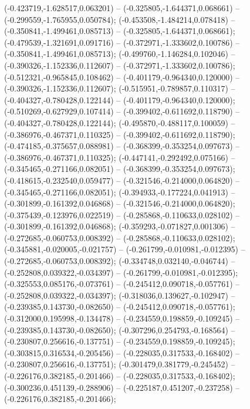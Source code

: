  (-0.423719,-1.628517,0.063201) -- (-0.325805,-1.644371,0.068661) -- (-0.299559,-1.765955,0.050784);
 (-0.453508,-1.484214,0.078418) -- (-0.350841,-1.499461,0.085713) -- (-0.325805,-1.644371,0.068661);
 (-0.479539,-1.321691,0.091716) -- (-0.372971,-1.333602,0.100786) -- (-0.350841,-1.499461,0.085713);
 (-0.499760,-1.146284,0.102046) -- (-0.390326,-1.152336,0.112607) -- (-0.372971,-1.333602,0.100786);
 (-0.512321,-0.965845,0.108462) -- (-0.401179,-0.964340,0.120000) -- (-0.390326,-1.152336,0.112607);
 (-0.515951,-0.789857,0.110317) -- (-0.404327,-0.780428,0.122144) -- (-0.401179,-0.964340,0.120000);
 (-0.510269,-0.627929,0.107414) -- (-0.399402,-0.611692,0.118790) -- (-0.404327,-0.780428,0.122144);
 (-0.495870,-0.488117,0.100059) -- (-0.386976,-0.467371,0.110325) -- (-0.399402,-0.611692,0.118790);
 (-0.474185,-0.375657,0.088981) -- (-0.368399,-0.353254,0.097673) -- (-0.386976,-0.467371,0.110325);
 (-0.447141,-0.292492,0.075166) -- (-0.345465,-0.271166,0.082051) -- (-0.368399,-0.353254,0.097673);
 (-0.418615,-0.232540,0.059477) -- (-0.321546,-0.214000,0.064820) -- (-0.345465,-0.271166,0.082051);
 (-0.394933,-0.177224,0.041913) -- (-0.301899,-0.161392,0.046868) -- (-0.321546,-0.214000,0.064820);
 (-0.375439,-0.123976,0.022519) -- (-0.285868,-0.110633,0.028102) -- (-0.301899,-0.161392,0.046868);
 (-0.359293,-0.071827,0.001306) -- (-0.272685,-0.060753,0.008392) -- (-0.285868,-0.110633,0.028102);
 (-0.345881,-0.020005,-0.021757) -- (-0.261799,-0.010981,-0.012395) -- (-0.272685,-0.060753,0.008392);
 (-0.334748,0.032140,-0.046744) -- (-0.252808,0.039322,-0.034397) -- (-0.261799,-0.010981,-0.012395);
 (-0.325553,0.085176,-0.073761) -- (-0.245412,0.090718,-0.057761) -- (-0.252808,0.039322,-0.034397);
 (-0.318036,0.139627,-0.102947) -- (-0.239385,0.143730,-0.082650) -- (-0.245412,0.090718,-0.057761);
 (-0.312000,0.195998,-0.134478) -- (-0.234559,0.198859,-0.109245) -- (-0.239385,0.143730,-0.082650);
 (-0.307296,0.254793,-0.168564) -- (-0.230807,0.256616,-0.137751) -- (-0.234559,0.198859,-0.109245);
 (-0.303815,0.316534,-0.205456) -- (-0.228035,0.317533,-0.168402) -- (-0.230807,0.256616,-0.137751);
 (-0.301479,0.381779,-0.245452) -- (-0.226176,0.382185,-0.201466) -- (-0.228035,0.317533,-0.168402);
 (-0.300236,0.451139,-0.288906) -- (-0.225187,0.451207,-0.237258) -- (-0.226176,0.382185,-0.201466);
